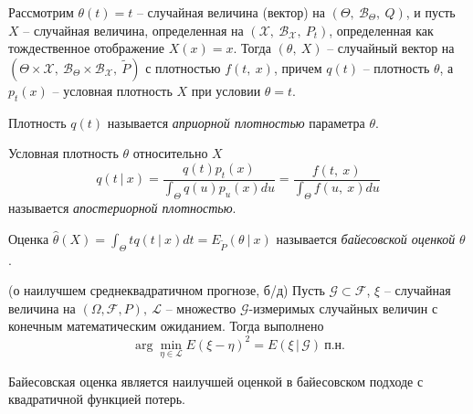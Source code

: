 Рассмотрим $\displaystyle \theta ( t) =t$ -- случайная величина (вектор) на $\displaystyle ( \Theta ,\ \mathcal{B}_{\Theta } ,\ Q)$, и пусть $\displaystyle X$ -- случайная величина, определенная на $\displaystyle (\mathcal{X} ,\ \mathcal{B}_{\mathcal{X}} ,\ P_{t})$, определенная как тождественное отображение $\displaystyle X( x) =x$. Тогда $\displaystyle ( \theta ,\ X)$ -- случайный вектор на $\displaystyle \left( \Theta \times \mathcal{X} ,\ \mathcal{B}_{\Theta } \times \mathcal{B}_{\mathcal{X}} ,\ \tilde{P}\right)$ с плотностью $\displaystyle f( t,\ x)$, причем $\displaystyle q( t)$ -- плотность $\displaystyle \theta $, а $\displaystyle p_{t}( x)$ -- условная плотность $\displaystyle X$ при условии $\displaystyle \theta =t$.
\begin{definition}
    Плотность $\displaystyle q( t)$ называется \textit{априорной плотностью} параметра $\displaystyle \theta $.
\end{definition}
\begin{definition}
    Условная плотность $\displaystyle \theta $ относительно $\displaystyle X$
    \begin{equation*}
        q( t\ |\ x) =\dfrac{q( t) p_{t}( x)}{\int _{\Theta } q( u) p_{u}( x) du} =\dfrac{f( t,\ x)}{\int _{\Theta } f( u,\ x) du}
    \end{equation*}
    называется \textit{апостериорной плотностью}.
\end{definition}
\begin{definition}
    Оценка $\displaystyle \hat{\theta }( X) =\int _{\Theta } tq( t\ |\ x) dt=E_{\tilde{P}}( \theta \ |\ x)$ называется \textit{байесовской оценкой} $\displaystyle \theta $.
\end{definition}
\begin{theorem}
    (о наилучшем среднеквадратичном прогнозе, б/д) Пусть $\mathcal{G} \subset \mathcal{F}$, $\xi$ -- случайная величина на $(\Omega, \mathcal{F}, P),\ \mathcal{L}$ -- множество $\mathcal{G}$-измеримых случайных величин с конечным математическим ожиданием. Тогда выполнено
    \begin{equation*}
        \arg\min_{\eta\in\mathcal{L}}E(\xi - \eta)^2 = E(\xi\, \vert\, \mathcal{G})\ \text{п.н.}
    \end{equation*}
\end{theorem}
\begin{theorem}
    Байесовская оценка является наилучшей оценкой в байесовском подходе с квадратичной функцией потерь.
\end{theorem}
